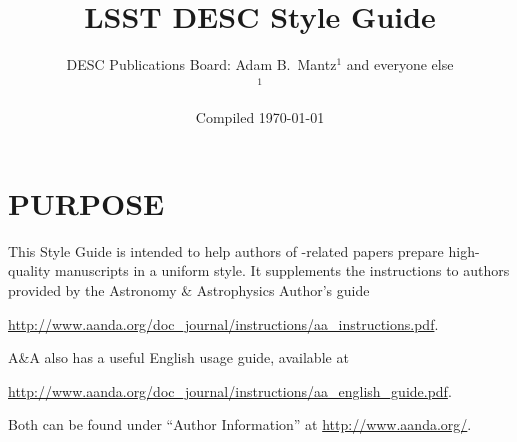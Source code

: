 \documentclass[letterpaper,11pt]{article}
\begin{document}

\title{\vspace{5cm}LSST DESC Style Guide}
\author{DESC Publications Board: Adam B.\ Mantz$^1$ and everyone else
  \smallskip\\{\small
    $^1$\suphysics
}}
\date{Compiled \today}
\maketitle
\thispagestyle{fancy}

\clearpage
\fancyhead{}
\fancyfoot[C]{\thepage}
\setcounter{page}{1}

\tableofcontents

\clearpage
{}
\setcounter{page}{1}

\section{PURPOSE}

This Style Guide is intended to help authors of \Planck-related papers prepare
high-quality manuscripts in a uniform style. It supplements the instructions
to authors provided by the  Astronomy \& Astrophysics Author's guide 

\url{http://www.aanda.org/doc_journal/instructions/aa_instructions.pdf}.

\noindent A\&A also has a useful English usage guide, available at 

\url{http://www.aanda.org/doc_journal/instructions/aa_english_guide.pdf}.

\noindent Both can be found under ``Author Information'' at
\url{http://www.aanda.org/}.


%
%
\end{document}
